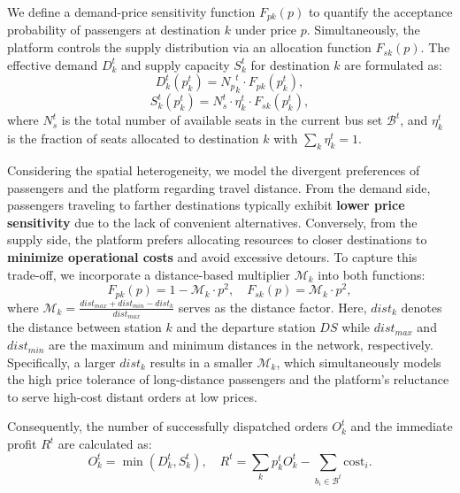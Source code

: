 \documentclass[lettersize,journal]{IEEEtran}
\begin{document}
We define a demand-price sensitivity function $F_{pk}(p)$ to quantify the acceptance probability of passengers at destination $k$ under price $p$. 
Simultaneously, the platform controls the supply distribution via an allocation function $F_{sk}(p)$.
The effective demand $D^t_k$ and supply capacity $S^t_k$ for destination $k$ are formulated as:
\begin{equation}
    D^t_k(p^t_k) = {N_p}^t_k \cdot F_{pk}(p^t_k),
\end{equation}
\begin{equation}
    S^t_k(p^t_k) = N_{s}^t \cdot \eta^t_k \cdot F_{sk}(p^t_k),
\end{equation}
where $N_{s}^t$ is the total number of available seats in the current bus set $\mathcal{B}^t$, and $\eta^t_k$ is the fraction of seats allocated to destination $k$ with $\sum_k \eta^t_k = 1$.

Considering the spatial heterogeneity, we model the divergent preferences of passengers and the platform regarding travel distance. 
From the demand side, passengers traveling to farther destinations typically exhibit \textbf{lower price sensitivity} due to the lack of convenient alternatives. 
Conversely, from the supply side, the platform prefers allocating resources to closer destinations to \textbf{minimize operational costs} and avoid excessive detours. 
To capture this trade-off, we incorporate a distance-based multiplier $\mathcal{M}_k$ into both functions:
\begin{equation}
    F_{pk}(p) = 1 - \mathcal{M}_k \cdot p^2, \quad F_{sk}(p) = \mathcal{M}_k \cdot p^2,
\end{equation}
where $\mathcal{M}_k = \frac{dist_{max} + dist_{min} - dist_{k}}{dist_{max}}$ serves as the distance factor. 
Here, $dist_{k}$ denotes the distance between station $k$ and the departure station $DS$ while $dist_{max}$ and $dist_{min}$ are the maximum and minimum distances in the network, respectively. 
Specifically, a larger $dist_k$ results in a smaller $\mathcal{M}_k$, which simultaneously models the high price tolerance of long-distance passengers and the platform's reluctance to serve high-cost distant orders at low prices.

Consequently, the number of successfully dispatched orders $O^t_k$ and the immediate profit $R^t$ are calculated as:
\begin{equation}
    O^t_k = \min(D^t_k, S^t_k), \quad R^{t} = \sum_k p^t_k O^t_k - \sum_{b_i \in \mathcal{B}^t} \text{cost}_i.
\end{equation}
\end{document}
